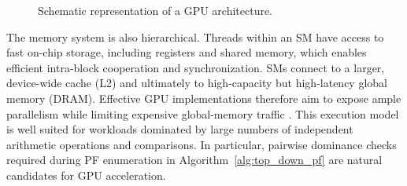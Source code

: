 \documentclass[letterpaper]{article}
\begin{document}
\begin{figure}[tbp]
{}
    \caption{Schematic representation of a GPU architecture.}
    \label{fig:gpu_arch}
\end{figure}
The memory system is also hierarchical. Threads within an SM have access to fast on-chip storage, including registers and shared memory, which enables efficient intra-block cooperation and synchronization. SMs connect to a larger, device-wide cache (L2) and ultimately to high-capacity but high-latency global memory (DRAM). Effective GPU implementations therefore aim to expose ample parallelism while limiting expensive global-memory traffic \cite{nickolls2010gpu}.
This execution model is well suited for workloads dominated by large numbers of independent arithmetic operations and comparisons. In particular, pairwise dominance checks required during PF enumeration in Algorithm~\ref{alg:top_down_pf} are natural candidates for GPU acceleration.
\end{document}
